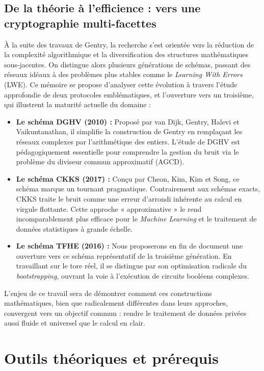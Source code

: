 \subsection{De la théorie à l'efficience : vers une cryptographie multi-facettes}

À la suite des travaux de Gentry, la recherche s'est orientée vers la réduction de la complexité algorithmique et la diversification des structures mathématiques sous-jacentes. On distingue alors plusieurs générations de schémas, passant des réseaux idéaux à des problèmes plus stables comme le \textit{Learning With Errors} (LWE). Ce mémoire se propose d'analyser cette évolution à travers l'étude approfondie de deux protocoles emblématiques, et l'ouverture vers un troisième, qui illustrent la maturité actuelle du domaine :

\begin{itemize}
    \item \textbf{Le schéma DGHV (2010) :} Proposé par van Dijk, Gentry, Halevi et Vaikuntanathan, il simplifie la construction de Gentry en remplaçant les réseaux complexes par l'arithmétique des entiers. L'étude de DGHV est pédagogiquement essentielle pour comprendre la gestion du bruit via le problème du diviseur commun approximatif (AGCD).
    \item \textbf{Le schéma CKKS (2017) :} Conçu par Cheon, Kim, Kim et Song, ce schéma marque un tournant pragmatique. Contrairement aux schémas exacts, CKKS traite le bruit comme une erreur d'arrondi inhérente au calcul en virgule flottante. Cette approche « approximative » le rend incomparablement plus efficace pour le \textit{Machine Learning} et le traitement de données statistiques à grande échelle.
    \item \textbf{Le schéma TFHE (2016) :} Nous proposerons en fin de document une ouverture vers ce schéma représentatif de la troisième génération. En travaillant sur le tore réel, il se distingue par son optimisation radicale du \textit{bootstrapping}, ouvrant la voie à l'exécution de circuits booléens complexes.
\end{itemize}

L'enjeu de ce travail sera de démontrer comment ces constructions mathématiques, bien que radicalement différentes dans leurs approches, convergent vers un objectif commun : rendre le traitement de données privées aussi fluide et universel que le calcul en clair.

\section{Outils théoriques et prérequis}

